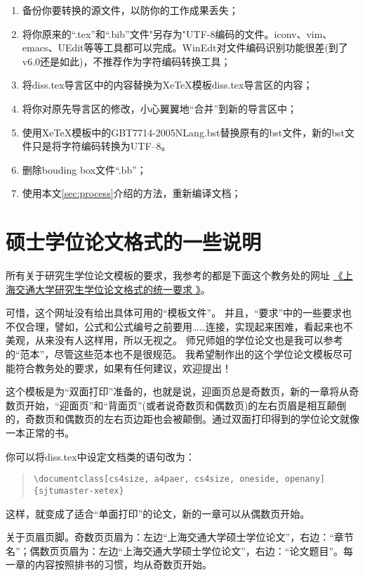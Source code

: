 \begin{enumerate}
\item 备份你要转换的源文件，以防你的工作成果丢失；
\item 将你原来的``.tex''和``.bib''文件"另存为"UTF-8编码的文件。iconv、vim、emacs、UEdit等等工具都可以完成。WinEdt对文件编码识别功能很差(到了v6.0还是如此)，不推荐作为字符编码转换工具；
\item 将diss.tex导言区中的内容替换为XeTeX模板diss.tex导言区的内容；
\item 将你对原先导言区的修改，小心翼翼地``合并''到新的导言区中；
\item 使用XeTeX模板中的GBT7714-2005NLang.bst替换原有的bst文件，新的bst文件只是将字符编码转换为UTF--8。
\item 删除bouding box文件``.bb''；
\item 使用本文\ref{sec:process}介绍的方法，重新编译文档；
\end{enumerate}

\section{硕士学位论文格式的一些说明}
\label{sec:thesisformat}

所有关于研究生学位论文模板的要求，我参考的都是下面这个教务处的网址
\href{http://www.gs.sjtu.edu.cn/policy/fileShow.ahtml?id=130}{《上海交通大学研究生学位论文格式的统一要求 》}。

可惜，这个网址没有给出具体可用的“模板文件”。
并且，``要求''中的一些要求也不仅合理，譬如，公式和公式编号之前要用……连接，实现起来困难，看起来也不美观，从来没有人这样用，所以无视之。
师兄师姐的学位论文也是我可以参考的“范本”，尽管这些范本也不是很规范。
我希望制作出的这个学位论文模板尽可能符合教务处的要求，如果有任何建议，欢迎提出！

这个模板是为``双面打印''准备的，也就是说，迎面页总是奇数页，新的一章将从奇数页开始，``迎面页''和``背面页''(或者说奇数页和偶数页)的左右页眉是相互颠倒的，奇数页和偶数页的左右页边距也会被颠倒。通过双面打印得到的学位论文就像一本正常的书。

你可以将diss.tex中设定文档类的语句改为：

\begin{quote}
  {\scriptsize\verb+\documentclass[cs4size, a4paer, cs4size, oneside, openany]{sjtumaster-xetex}+}
\end{quote}

这样，就变成了适合“单面打印”的论文，新的一章可以从偶数页开始。

关于页眉页脚。奇数页页眉为：左边``上海交通大学硕士学位论文''，右边：``章节名''；偶数页页眉为：左边``上海交通大学硕士学位论文''，右边：``论文题目''。每一章的内容按照排书的习惯，均从奇数页开始。

